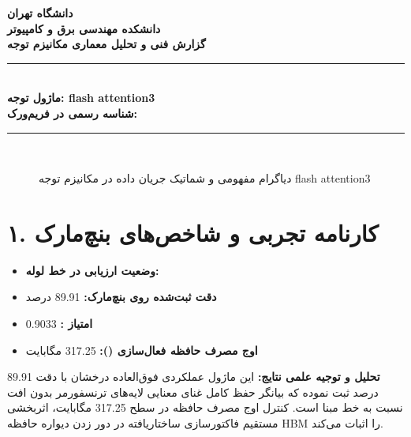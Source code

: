 \documentclass[12pt,a4paper]{article}
\begin{document}
\begin{center}
{\Large\bfseries دانشگاه تهران}\\[0.2cm]
{\large\bfseries دانشکده مهندسی برق و کامپیوتر}\\[0.2cm]
{\large\bfseries گزارش فنی و تحلیل معماری مکانیزم توجه}\\[0.5cm]
\rule{\linewidth}{1pt}\\[0.3cm]
{\LARGE\bfseries ماژول توجه: flash attention3}\\[0.2cm]
{\large \textbf{شناسه رسمی در فریم‌ورک:} }\\[0.2cm]
\rule{\linewidth}{1pt}\\[0.5cm]
\end{center}

\begin{figure}[H]
\centering
{}
\caption{دیاگرام مفهومی و شماتیک جریان داده در مکانیزم توجه flash attention3}
\end{figure}

\section*{۱. کارنامه تجربی و شاخص‌های بنچ‌مارک}
\begin{itemize}
\item \textbf{وضعیت ارزیابی در خط لوله:} 
\item \textbf{دقت ثبت‌شده روی بنچ‌مارک:} 89.91 درصد
\item \textbf{امتیاز :} 0.9033
\item \textbf{اوج مصرف حافظه فعال‌سازی ():} 317.25 مگابایت
\end{itemize}
\textbf{تحلیل و توجیه علمی نتایج:} این ماژول عملکردی فوق‌العاده درخشان با دقت 89.91 درصد ثبت نموده که بیانگر حفظ کامل غنای معنایی لایه‌های ترنسفورمر بدون افت نسبت به خط مبنا است. کنترل اوج مصرف حافظه در سطح 317.25 مگابایت، اثربخشی مستقیم فاکتورسازی ساختاریافته در دور زدن دیواره حافظه HBM را اثبات می‌کند.
\end{document}
